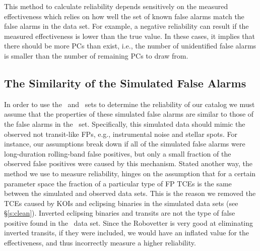 This method to calculate reliability depends sensitively on the measured effectiveness which relies on how well the set of known false alarms match the false alarms in the \opstce{} data set. For example, a negative reliability can result if the measured effectiveness is lower than the true value. In these cases, it implies that there should be more PCs than exist, i.e., the number of unidentified false alarms is smaller than the number of remaining PCs to draw from.  


\subsection{The Similarity of the Simulated False Alarms}
\label{s:simularity}
In order to use the \scrtce\ and \invtce\ sets to determine the reliability of our catalog we must assume that the properties of these simulated false alarms are similar to those of the false alarms in the \opstce\ set.  Specifically, this simulated data should mimic the observed not transit-like FPs, e.g., instrumental noise and stellar spots. For instance, our assumptions break down if all of the simulated false alarms were long-duration rolling-band false positives, but only a small fraction of the observed false positives were caused by this mechanism.  Stated another way, the method we use to measure reliability, hinges on the assumption that for a certain parameter space the fraction of a particular type of FP TCEs is the same between the simulated and observed data sets.  This is the reason we removed the TCEs caused by KOIs and eclipsing binaries in the simulated data sets (see \S\ref{s:clean}). Inverted eclipsing binaries and transits are not the type of false positive found in the \opstce\ data set.  Since the Robovetter is very good at eliminating inverted transits, if they were included, we would have an inflated value for the effectiveness, and thus incorrectly measure a higher reliability. 


